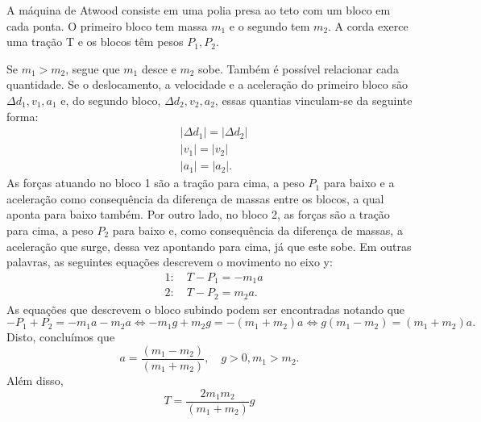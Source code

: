 \documentclass[physics_notes.tex]{subfiles}
\begin{document}
\begin{example}
	A máquina de Atwood consiste em uma polia presa ao teto com um bloco em cada ponta. O primeiro bloco tem massa
	$m_{1}$ e o segundo tem $m_{2}$. A corda exerce uma tração T e os blocos têm pesos $P_{1}, P_{2}.$

	Se $m_{1}>m_{2}$, segue que $m_{1}$ desce e $m_{2}$ sobe. Também é possível relacionar cada quantidade.
	Se o deslocamento, a velocidade e a aceleração do primeiro bloco são $\Delta d_{1}, v_{1}, a_{1}$ e, do segundo bloco,
	$\Delta d_{2}, v_{2}, a_{2}$, essas quantias vinculam-se da seguinte forma:
	\begin{align*}
		 & |\Delta d_{1}| = |\Delta d_{2}| \\
		 & |v_{1}| = |v_{2}|               \\
		 & |a_{1}| = |a_{2}|.
	\end{align*}
	As forças atuando no bloco 1 são a tração para cima, a peso $P_{1}$ para baixo e a aceleração como consequência da
	diferença de massas entre os blocos, a qual aponta para baixo também. Por outro lado, no bloco 2, as forças são
	a tração para cima, a peso $P_{2}$ para baixo e, como consequência da diferença de massas, a aceleração que surge,
	dessa vez apontando para cima, já que este sobe. Em outras palavras, as seguintes equações descrevem o movimento no
	eixo y:
	\begin{align*}
		 & 1:\quad T-P_{1} = -m_{1}a \\
		 & 2:\quad T-P_{2} = m_{2}a.
	\end{align*}
	As equações que descrevem o bloco subindo podem ser encontradas notando que $-P_{1}+P_{2}=-m_{1}a-m_{2}a \Longleftrightarrow
		-m_{1}g + m_{2}g = -(m_{1}+m_{2})a \Longleftrightarrow  g(m_{1}-m_{2}) = (m_{1}+m_{2})a.$ Disto, concluímos que
	$$
		a = \frac{(m_{1}-m_{2})}{(m_{1}+m_{2})},\quad g>0, m_{1}>m_{2}.
	$$
	Além disso,
	$$
		T = \frac{2m_{1}m_{2}}{(m_{1}+m_{2})}g
	$$
\end{example}
\end{document}
